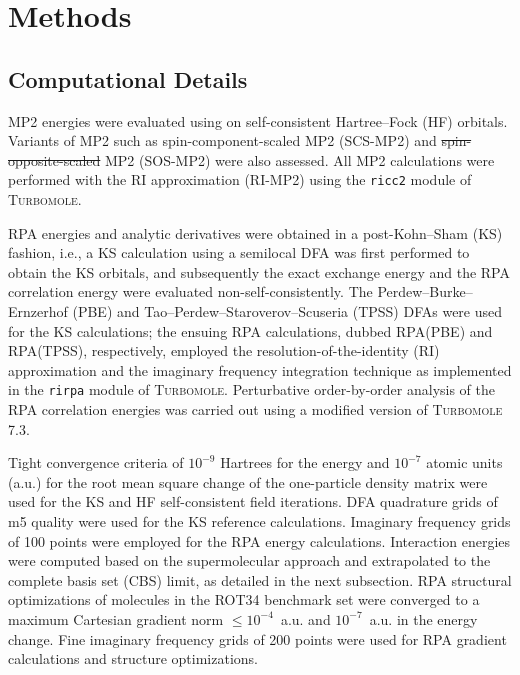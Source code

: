 \documentclass[journal=jctcce,manuscript=article]{achemso}
\providecommand{\DIFadd}[1]{{\protect\color{blue}\uwave{#1}}} %
\providecommand{\DIFdel}[1]{{\protect\color{red}\sout{#1}}}                      %
\providecommand{\DIFaddbegin}{} %
\providecommand{\DIFaddend}{} %
\providecommand{\DIFdelbegin}{} %
\providecommand{\DIFdelend}{} %
\newcommand{\DIFscaledelfig}{0.5}
\newlength{\DIFdelgraphicswidth} %
\newlength{\DIFdelgraphicsheight} %
\newcommand{\DIFaddincludegraphics}[2][]{{\color{blue}\fbox{\DIFOincludegraphics[#1]{#2}}}} %
\newcommand{\DIFdelincludegraphics}[2][]{%
\sbox{\DIFdelgraphicsbox}{\DIFOincludegraphics[#1]{#2}}%
\settoboxwidth{\DIFdelgraphicswidth}{\DIFdelgraphicsbox} %
\settoboxtotalheight{\DIFdelgraphicsheight}{\DIFdelgraphicsbox} %
\scalebox{\DIFscaledelfig}{%
\parbox[b]{\DIFdelgraphicswidth}{\usebox{\DIFdelgraphicsbox}\\[-\baselineskip] \rule{\DIFdelgraphicswidth}{0em}}\llap{\resizebox{\DIFdelgraphicswidth}{\DIFdelgraphicsheight}{%
\setlength{\unitlength}{\DIFdelgraphicswidth}%
\begin{picture}(1,1)%
\thicklines\linethickness{2pt} %
{\color[rgb]{1,0,0}\put(0,0){\framebox(1,1){}}}%
{\color[rgb]{1,0,0}\put(0,0){\line( 1,1){1}}}%
{\color[rgb]{1,0,0}\put(0,1){\line(1,-1){1}}}%
\end{picture}%
}\hspace*{3pt}}} %
} %
\DeclareRobustCommand{\DIFaddbegin}{\DIFOaddbegin \let\includegraphics\DIFaddincludegraphics} %
\DeclareRobustCommand{\DIFaddend}{\DIFOaddend \let\includegraphics\DIFOincludegraphics} %
\DeclareRobustCommand{\DIFdelbegin}{\DIFOdelbegin \let\includegraphics\DIFdelincludegraphics} %
\DeclareRobustCommand{\DIFdelend}{\DIFOaddend \let\includegraphics\DIFOincludegraphics} %
\begin{document}
\section{Methods}
\label{sec:methods}
\subsection{Computational Details}

MP2 energies were evaluated using on self-consistent Hartree--Fock (HF)
orbitals. 
Variants of MP2 such as spin-component-scaled MP2 (SCS-MP2)\cite{Grimme03JChemPhys118p9095}
and \DIFdelbegin \DIFdel{spin-opposite-scaled }\DIFdelend \DIFaddbegin \DIFadd{scaled opposite-spin }\DIFaddend MP2 (SOS-MP2)\cite{doi:10.1063/1.1809602} were also assessed.
All MP2 calculations were performed with the RI approximation (RI-MP2)
using the \texttt{ricc2}
module\cite{b515355g} of \textsc{Turbomole}.\cite{Furche14WIREsComputMolSci4p91}

RPA energies and analytic derivatives were obtained in a post-Kohn--Sham
(KS) fashion, i.e., a KS calculation using a semilocal DFA was first performed to
obtain the KS orbitals, and subsequently the exact exchange energy and the RPA
correlation energy were evaluated non-self-consistently. The
Perdew--Burke--Ernzerhof (PBE)\cite{Perdew96PhysRevLett77p3865} and
Tao--Perdew--Staroverov--Scuseria (TPSS)\cite{Tao03PhysRevLett91p146401}
DFAs were used for the KS calculations; the ensuing RPA calculations,
dubbed RPA(PBE) and RPA(TPSS), respectively, employed the
resolution-of-the-identity (RI) approximation and the imaginary frequency
integration technique as implemented in the \texttt{rirpa} module\cite{Eshuis10JChemPhys132p234114}
of \textsc{Turbomole}.\cite{Furche14WIREsComputMolSci4p91}
Perturbative order-by-order analysis of the RPA correlation energies was carried out using 
a modified version of \textsc{Turbomole 7.3}.

Tight convergence criteria of $10^{-9}$ Hartrees for the energy and
$10^{-7}$ atomic units (a.u.) for the root mean square change of the
one-particle density matrix were used for 
the KS and HF self-consistent field iterations. DFA quadrature grids of
m5 quality\cite{Treutler95JChemPhys102p346} were used for the KS
reference calculations. Imaginary frequency grids of 100 points 
were employed for the RPA energy calculations. Interaction energies
were computed based on the supermolecular approach and extrapolated to
the complete basis set (CBS) limit, as detailed in the next subsection.
RPA structural optimizations\cite{Burow14JChemTheoryComput10p180}
of molecules in the ROT34 benchmark set were converged to a maximum
Cartesian gradient norm $\leq 10^{-4}$~a.u. and $10^{-7}$~a.u. in the
energy change. Fine imaginary frequency grids of 200 points were used
for RPA gradient calculations and structure optimizations.
\end{document}
